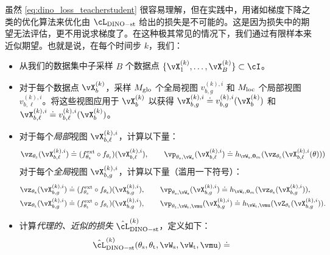 \documentclass[../../book-main_zh.tex]{subfiles}
\begin{document}
虽然 \eqref{eq:dino_loss_teacherstudent} 很容易理解，但在实践中，用诸如梯度下降之类的优化算法来优化由 \(\cL_{\dino{}-\student\teacher}\) 给出的损失是不可能的。这是因为损失中的期望无法评估，更不用说求梯度了。在这种极其常见的情况下，我们通过有限样本来近似期望。也就是说，在每个时间步 \(k\)，我们：
\begin{itemize}
    \item 从我们的数据集中子采样 \(B\) 个数据点 \(\{\vX_{1}^{(k)}, \dots, \vX_{B}^{(k)}\} \subset \cI\)。
    \item 对于每个数据点 \(\vX_{b}^{(k)}\)，采样 \(M_{\mathrm{glo}}\) 个全局视图 \(v_{b, g}^{(k), i}\) 和 \(M_{\mathrm{loc}}\) 个局部视图 \(v_{b, \ell}^{(k), i}\)。将这些视图应用于 \(\vX_{b}^{(k)}\) 以获得 \(\vX_{b, g}^{(k), i} \doteq v_{b, g}^{(k), i}(\vX_{b}^{(k)})\) 和 \(\vX_{b, \ell}^{(k), i} \doteq v_{b, \ell}^{(k), i}(\vX_{b}^{(k)})\)。
    \item 对于每个\textit{局部}视图 \(\vX_{b, \ell}^{(k), i}\)，计算以下量：
    \begin{equation}
        \vz_{\theta_{\student}}(\vX_{b, \ell}^{(k), i}) \doteq (f_{\theta_{\student}}^{\ext} \circ f_{\theta_{\student}})(\vX_{b, \ell}^{(k), i}), \qquad \vp_{\theta_{\student}, \vW_{\student}}(\vX_{b, \ell}^{(k), i}) \doteq h_{\vW_{\student}, \vzero_{m}}(\vz_{\theta_{\student}}(\vX_{b, \ell}^{(k), i}(\theta)))
    \end{equation}
    对于每个\textit{全局}视图 \(\vX_{b, g}^{(k), i}\)，计算以下量（滥用一下符号）：
    \begin{align}
        &\vz_{\theta_{\student}}(\vX_{b, g}^{(k), i}) \doteq (f_{\theta_{\student}}^{\ext} \circ f_{\theta_{\student}})(\vX_{b, g}^{(k), i}), \qquad \vp_{\theta_{\student}, \vW_{\student}}(\vX_{b, g}^{(k), i}) \doteq h_{\vW_{\student}, \vzero_{m}}(\vz_{\theta_{\student}}(\vX_{b, g}^{(k), i})), \\
        &\vz_{\theta_{\teacher}}(\vX_{b, g}^{(k), i}) \doteq (f_{\theta_{\teacher}}^{\ext} \circ f_{\theta_{\teacher}})(\vX_{b, g}^{(k), i}), \qquad \vp_{\theta_{\teacher}, \vW_{\teacher}, \vmu}(\vX_{b, g}^{(k), i}) \doteq h_{\vW_{\teacher}, \vmu}(\vZ_{\theta_{\teacher}}(\vX_{b, g}^{(k), i})).
    \end{align}
    \item 计算\textit{代理的、近似的损失} \(\hat{\cL}_{\dino-\student\teacher}^{(k)}\)，定义如下：
    \begin{align}\label{eq:dino_loss_teacherstudent_empirical}
        &\hat{\cL}_{\dino{}-\student\teacher}^{(k)}(\theta_{\student}, \theta_{\teacher}, \vW_{\student}, \vW_{\teacher}, \vmu) \doteq

\end{align}
\end{itemize}
\end{document}
